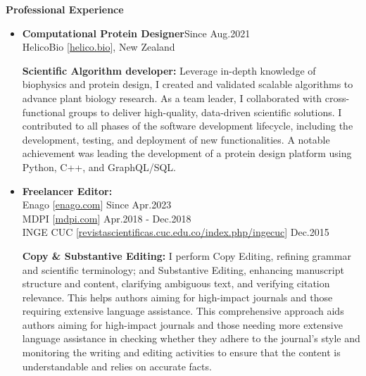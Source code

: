 
{\bf\Large Professional \textcolor{my_blue}{Experience}}\\ \vspace*{-6mm}

\begin{itemize}


    \item {\bf Computational Protein Designer}\hfill \textcolor{my_blue}{Since Aug.2021}\\
          HelicoBio [\href{www.helico.bio}{helico.bio}],
          New Zealand

              {\noindent
                  \textbf{Scientific Algorithm developer:}
                  Leverage in-depth knowledge of biophysics and protein design, I created and validated scalable algorithms to advance plant biology research. As a team leader, I collaborated with cross-functional groups to deliver high-quality, data-driven scientific solutions. I contributed to all phases of the software development lifecycle, including the development, testing, and deployment of new functionalities. A notable achievement was leading the development of a protein design platform using Python, C++, and GraphQL/SQL.
              }

    \item {\bf Freelancer Editor:}\\
          Enago [\href{https://www.enago.com/}{enago.com}] \hfill
          \textcolor{my_blue}{Since Apr.2023}\\
          MDPI [\href{https://www.mdpi.com/}{mdpi.com}] \hfill
          \textcolor{my_blue}{Apr.2018 - Dec.2018}\\
          INGE CUC [\href{https://revistascientificas.cuc.edu.co/index.php/ingecuc}{revistascientificas.cuc.edu.co/index.php/ingecuc}] \hfill
          \textcolor{my_blue}{Dec.2015}

          {\noindent
              \textbf{Copy \& Substantive Editing:}
              I perform Copy Editing, refining grammar and scientific terminology; and Substantive Editing, enhancing manuscript structure and content, clarifying ambiguous text, and verifying citation relevance. This helps authors aiming for high-impact journals and those requiring extensive language assistance. This comprehensive approach aids authors aiming for high-impact journals and those needing more extensive language assistance in checking whether they adhere to the journal's style and monitoring the writing and editing activities to ensure that the content is understandable and relies on accurate facts.
          }


\end{itemize}
